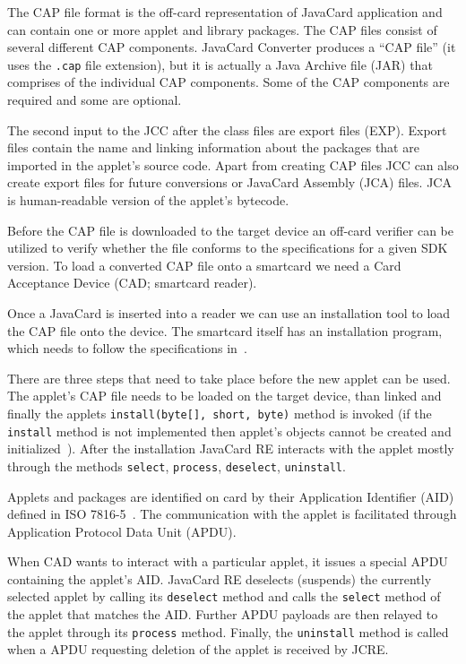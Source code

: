 \documentclass{../llncs/llncs}
\begin{document}
The CAP file format is the off-card representation of JavaCard application and can contain one or more applet and library packages. The CAP files consist of several different CAP components. JavaCard Converter produces a ``CAP file'' (it uses the \texttt{.cap} file extension), but it is actually a Java Archive file (JAR) that comprises of the individual CAP components. Some of the CAP components are required and some are optional.

The second input to the JCC after the class files are export files (EXP). Export files contain the name and linking information about the packages that are imported in the applet's source code.
Apart from creating CAP files JCC can also create export files for future conversions or JavaCard Assembly (JCA) files. JCA is human-readable version of the applet's bytecode.

Before the CAP file is downloaded to the target device an off-card verifier can be utilized to verify whether the file conforms to the specifications for a given SDK version. To load a converted CAP file onto a smartcard we need a Card Acceptance Device (CAD; smartcard reader).

Once a JavaCard is inserted into a reader we can use an installation tool to load the CAP file onto the device. The smartcard itself has an installation program, which needs to follow the specifications in~\cite{jcspecs31download}.

There are three steps that need to take place before the new applet can be used. The applet's CAP file needs to be loaded on the target device, than linked and finally the applets \texttt{install(byte[], short, byte)} method is invoked (if the \texttt{install} method is not implemented then applet's objects cannot be created and initialized~\cite{jcspecs31download}). After the installation JavaCard RE interacts with the applet mostly through the methods \texttt{select}, \texttt{process}, \texttt{deselect}, \texttt{uninstall}.


Applets and packages are identified on card by their Application Identifier (AID) defined in ISO 7816-5~\cite{jcspecs31download}. The communication with the applet is facilitated through Application Protocol Data Unit (APDU). 

When CAD wants to interact with a particular applet, it issues a special APDU containing the applet's AID. JavaCard RE deselects (suspends) the currently selected applet by calling its \texttt{deselect} method and calls the \texttt{select} method of the applet that matches the AID. Further APDU payloads are then relayed to the applet through its \texttt{process} method. Finally, the \texttt{uninstall} method is called when a APDU requesting deletion of the applet is received by JCRE.
\end{document}
